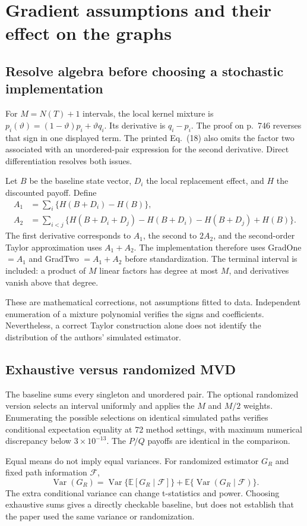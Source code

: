\documentclass[11pt,a4paper]{article}
\newcommand{\E}{\mathbb{E}}
\newcommand{\Var}{\operatorname{Var}}
\begin{document}
\clearpage
\section{Gradient assumptions and their effect on the graphs}
\subsection{Resolve algebra before choosing a stochastic implementation}
For $M=N(T)+1$ intervals, the local kernel mixture is
$p_i(\vartheta)=(1-\vartheta)p_i+\vartheta q_i$.
Its derivative is $q_i-p_i$. The proof on p.~746 reverses that sign
in one displayed term. The printed Eq.~(18) also omits the factor two
associated with an unordered-pair expression for the second derivative.
Direct differentiation resolves both issues.

Let $B$ be the baseline state vector, $D_i$ the local replacement effect,
and $H$ the discounted payoff. Define
\begin{align}
A_1&=\sum_i\{H(B+D_i)-H(B)\},\\
A_2&=\sum_{i<j}\{H(B+D_i+D_j)-H(B+D_i)-H(B+D_j)+H(B)\}.
\end{align}
The first derivative corresponds to $A_1$, the second to $2A_2$, and
the second-order Taylor approximation uses $A_1+A_2$. The implementation
therefore uses GradOne $=A_1$ and GradTwo $=A_1+A_2$ before standardization.
The terminal interval is included: a product of $M$ linear factors has
degree at most $M$, and derivatives vanish above that degree.

These are mathematical corrections, not assumptions fitted to data.
Independent enumeration of a mixture polynomial verifies the signs and
coefficients. Nevertheless, a correct Taylor construction alone does
not identify the distribution of the authors' simulated estimator.

\subsection{Exhaustive versus randomized MVD}
The baseline sums every singleton and unordered pair. The optional
randomized version selects an interval uniformly and applies the
$M$ and $M/2$ weights. Enumerating the possible selections on identical
simulated paths verifies conditional expectation equality at 72 method
settings, with maximum numerical discrepancy below $3\times10^{-13}$.
The $P/Q$ payoffs are identical in the comparison.

Equal means do not imply equal variances. For randomized estimator
$G_R$ and fixed path information $\mathcal F$,
\[
\Var(G_R)=\Var\{\E[G_R\mid\mathcal F]\}
+\E\{\Var(G_R\mid\mathcal F)\}.
\]
The extra conditional variance can change t-statistics and power.
Choosing exhaustive sums gives a directly checkable baseline, but
does not establish that the paper used the same variance or randomization.
\end{document}
